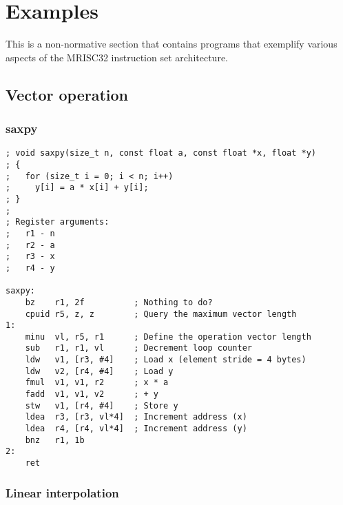 %

\onecolumn

\chapter{Examples}

This is a non-normative section that contains programs that exemplify various
aspects of the MRISC32 instruction set architecture.

\section{Vector operation}

\subsection{saxpy}

\begin{lstlisting}[style=assembler]
; void saxpy(size_t n, const float a, const float *x, float *y)
; {
;   for (size_t i = 0; i < n; i++)
;     y[i] = a * x[i] + y[i];
; }
;
; Register arguments:
;   r1 - n
;   r2 - a
;   r3 - x
;   r4 - y

saxpy:
    bz    r1, 2f          ; Nothing to do?
    cpuid r5, z, z        ; Query the maximum vector length
1:
    minu  vl, r5, r1      ; Define the operation vector length
    sub   r1, r1, vl      ; Decrement loop counter
    ldw   v1, [r3, #4]    ; Load x (element stride = 4 bytes)
    ldw   v2, [r4, #4]    ; Load y
    fmul  v1, v1, r2      ; x * a
    fadd  v1, v1, v2      ; + y
    stw   v1, [r4, #4]    ; Store y
    ldea  r3, [r3, vl*4]  ; Increment address (x)
    ldea  r4, [r4, vl*4]  ; Increment address (y)
    bnz   r1, 1b
2:
    ret
\end{lstlisting}

\subsection{Linear interpolation}

